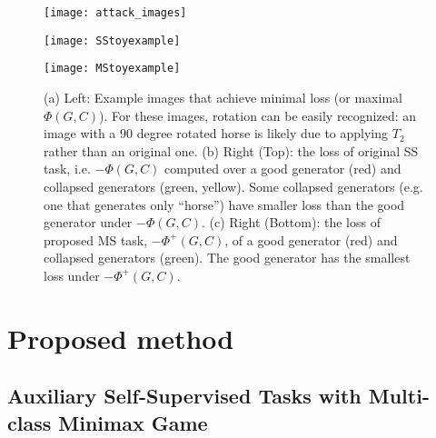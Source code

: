 \documentclass{article}
\begin{document}
\begin{figure}
  \begin{minipage}[c]{0.26\textwidth}
          \begin{flushright}
          \texttt{[image: attack\_images]}
          \end{flushright}
  \end{minipage}
  \begin{minipage}[c]{0.70\textwidth}
          \begin{center}
          \texttt{[image: SStoyexample]}
          \vspace{-0.8cm}
          \end{center}
          \begin{center}
          \texttt{[image: MStoyexample]}
          \end{center}
  \end{minipage}
  \caption{(a) Left: Example images that achieve minimal loss (or maximal $\Phi(G,C)$). For these images, rotation can be easily recognized: an image with a 90 degree rotated horse is likely due to applying $T_2$ rather than an original one. (b) Right (Top): the loss of original SS task, i.e. $-\Phi(G,C)$ computed over a good generator (red) and collapsed generators (green, yellow). 
  Some collapsed generators (e.g. one that generates only ``horse'') have smaller loss than the good generator under $-\Phi(G,C)$.
  (c) Right (Bottom): the loss of proposed MS task, $-\Phi^+(G, C)$, of a good generator (red) and collapsed generators (green). The good generator has the smallest loss under $-\Phi^+(G, C)$.
  }
  \label{classifiion_theorem_1}
\end{figure}




\section{Proposed method}
\label{proposed_method}

\subsection{Auxiliary Self-Supervised Tasks with Multi-class Minimax Game}
\end{document}
